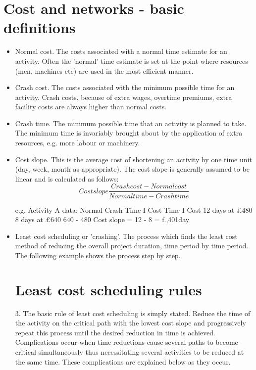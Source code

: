 \section{Cost and networks - basic definitions }
\begin{itemize}
\item Normal cost. The costs associated with a normal time estimate for an activity. Often 
the 'normal' time estimate is set at the point where resources (men, machines etc) are 
used in the most efficient manner. 
\item Crash cost. The costs associated with the minimum possible time for an activity. 
Crash costs, because of extra wages, overtime premiums, extra facility costs are 
always higher than normal costs. 
\item Crash time. The minimum possible time that an activity is planned to take. The 
minimum time is invariably brought about by the application of extra resources, e.g. 
more labour or machinery. 
\item Cost slope. This is the average cost of shortening an activity by one time unit (day, 
week, month as appropriate). The cost slope is generally assumed to be linear and is 
calculated as follows: 
\[ Cost slope  \frac{Crash cost - Normal cost }{Normal time - Crash time } \]




e.g. Activity A data: 
Normal Crash 
Time I Cost Time I Cost 12 days at £480 8 days at £640 640 - 480 Cost slope = 12 - 8 = f.,401day  

\item Least cost scheduling or 'crashing'. The process which finds the least cost method of reducing the overall project duration, time period by time period. 
The following example shows the process step by step. 



\section{Least cost scheduling rules} 3. The basic rule of least cost scheduling is simply stated. 
Reduce the time of the activity on the critical path with the lowest cost slope and progressively repeat this process until the desired reduction in time is achieved. 
Complications occur when time reductions cause several paths to become critical simultaneously thus necessitating several activities to be reduced at the same time. 
These complications are explained below as they occur. 


\end{itemize}
